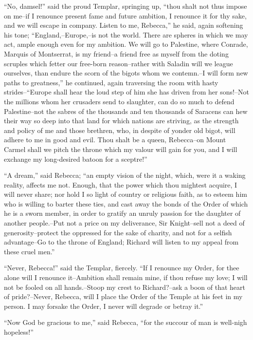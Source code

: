 ``No, damsel!'' said the proud Templar, springing up, ``thou shalt not
thus impose on me--if I renounce present fame and future ambition, I
renounce it for thy sake, and we will escape in company. Listen to me,
Rebecca,'' he said, again softening his tone; ``England,--Europe,--is
not the world. There are spheres in which we may act, ample enough even
for my ambition. We will go to Palestine, where Conrade, Marquis of
Montserrat, is my friend--a friend free as myself from the doting
scruples which fetter our free-born reason--rather with Saladin will we
league ourselves, than endure the scorn of the bigots whom we
contemn.--I will form new paths to greatness,'' he continued, again
traversing the room with hasty strides--``Europe shall hear the loud
step of him she has driven from her sons!--Not the millions whom her
crusaders send to slaughter, can do so much to defend Palestine--not the
sabres of the thousands and ten thousands of Saracens can hew their way
so deep into that land for which nations are striving, as the strength
and policy of me and those brethren, who, in despite of yonder old
bigot, will adhere to me in good and evil. Thou shalt be a queen,
Rebecca--on Mount Carmel shall we pitch the throne which my valour will
gain for you, and I will exchange my long-desired batoon for a
sceptre!''

``A dream,'' said Rebecca; ``an empty vision of the night, which, were
it a waking reality, affects me not. Enough, that the power which thou
mightest acquire, I will never share; nor hold I so light of country or
religious faith, as to esteem him who is willing to barter these ties,
and cast away the bonds of the Order of which he is a sworn member, in
order to gratify an unruly passion for the daughter of another
people.--Put not a price on my deliverance, Sir Knight--sell not a deed
of generosity--protect the oppressed for the sake of charity, and not
for a selfish advantage--Go to the throne of England; Richard will
listen to my appeal from these cruel men.''

``Never, Rebecca!'' said the Templar, fiercely. ``If I renounce my
Order, for thee alone will I renounce it--Ambition shall remain mine, if
thou refuse my love; I will not be fooled on all hands.--Stoop my crest
to Richard?--ask a boon of that heart of pride?--Never, Rebecca, will I
place the Order of the Temple at his feet in my person. I may forsake
the Order, I never will degrade or betray it.''

``Now God be gracious to me,'' said Rebecca, ``for the succour of man is
well-nigh hopeless!''


